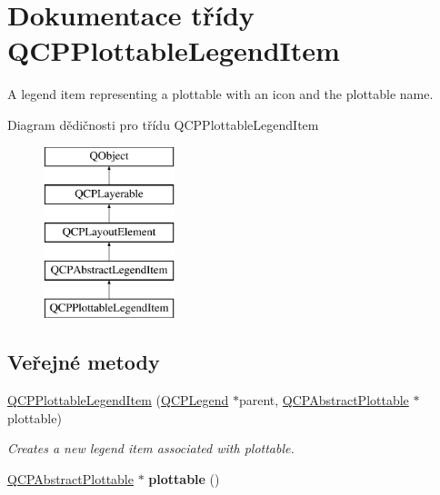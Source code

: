 \hypertarget{classQCPPlottableLegendItem}{}\section{Dokumentace třídy Q\+C\+P\+Plottable\+Legend\+Item}
\label{classQCPPlottableLegendItem}


A legend item representing a plottable with an icon and the plottable name.  


Diagram dědičnosti pro třídu Q\+C\+P\+Plottable\+Legend\+Item\begin{figure}[H]
\begin{center}
\leavevmode
\includegraphics[height=5.000000cm]{classQCPPlottableLegendItem}
\end{center}
\end{figure}
\subsection*{Veřejné metody}
\begin{DoxyCompactItemize}
\item 
\hyperlink{classQCPPlottableLegendItem_ac1072591fe409d3dabad51b23ee4d6c5}{Q\+C\+P\+Plottable\+Legend\+Item} (\hyperlink{classQCPLegend}{Q\+C\+P\+Legend} $\ast$parent, \hyperlink{classQCPAbstractPlottable}{Q\+C\+P\+Abstract\+Plottable} $\ast$plottable)
\begin{DoxyCompactList}\small\item\em Creates a new legend item associated with {\itshape plottable}. \end{DoxyCompactList}\item 
\hypertarget{classQCPPlottableLegendItem_af29e9a2c60b4cba0cac2447b8af7b488}{}\hyperlink{classQCPAbstractPlottable}{Q\+C\+P\+Abstract\+Plottable} $\ast$ {\bfseries plottable} ()\label{classQCPPlottableLegendItem_af29e9a2c60b4cba0cac2447b8af7b488}

\end{DoxyCompactItemize}
